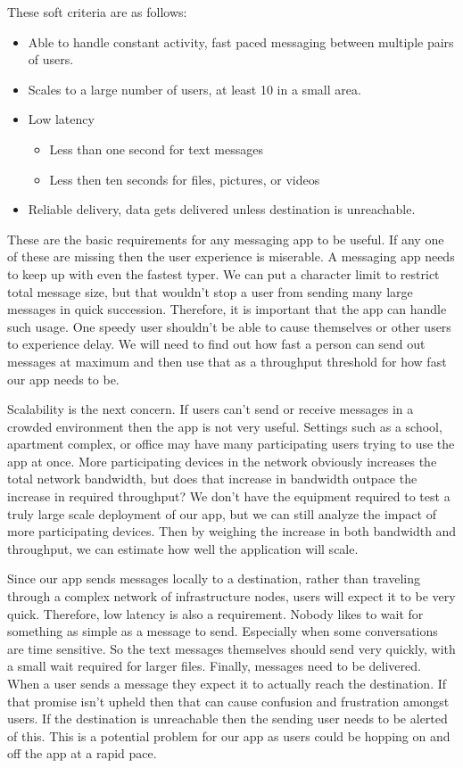 \documentclass[10pt]{article}
\begin{document}
These soft criteria are as follows:
\begin{itemize}
    \item Able to handle constant activity, fast paced messaging between multiple pairs of users.
    \item Scales to a large number of users, at least 10 in a small area.
    \item Low latency 
    \begin{itemize}
        \item Less than one second for text messages
        \item Less then ten seconds for files, pictures, or videos
    \end{itemize}
    \item Reliable delivery, data gets delivered unless destination is unreachable.
\end{itemize}
These are the basic requirements for any messaging app to be useful. If any one of these are missing then the user experience is miserable. 
A messaging app needs to keep up with even the fastest typer. We can put a character limit to restrict total message size, but that wouldn't stop a user from sending many large messages in quick succession. Therefore, it is important that the app can handle such usage. One speedy user shouldn't be able to cause themselves or other users to experience delay. We will need to find out how fast a person can send out messages at maximum and then use that as a throughput threshold for how fast our app needs to be.

Scalability is the next concern. If users can't send or receive messages in a crowded environment then the app is not very useful. Settings such as a school, apartment complex, or office may have many participating users trying to use the app at once. More participating devices in the network obviously increases the total network bandwidth, but does that increase in bandwidth outpace the increase in required throughput? We don't have the equipment required to test a truly large scale deployment of our app, but we can still analyze the impact of more participating devices. Then by weighing the increase in both bandwidth and throughput, we can estimate how well the application will scale.

Since our app sends messages locally to a destination, rather than traveling through a complex network of infrastructure nodes, users will expect it to be very quick. Therefore, low latency is also a requirement. Nobody likes to wait for something as simple as a message to send. Especially when some conversations are time sensitive. So the text messages themselves should send very quickly, with a small wait required for larger files.
Finally, messages need to be delivered. When a user sends a message they expect it to actually reach the destination. If that promise isn't upheld then that can cause confusion and frustration amongst users. If the destination is unreachable then the sending user needs to be alerted of this. This is a potential problem for our app as users could be hopping on and off the app at a rapid pace.
\end{document}
